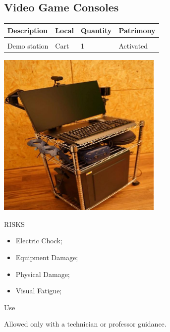 \subsection{Video Game Consoles}
\begin{tabularx}{\textwidth}{ Y  Y  Y  Y }
    \textbf{Description} &  \textbf{Local} &  \textbf{Quantity} & \textbf{Patrimony}\\
    \hline \\
     Demo station & Cart & 1 & Activated
\end{tabularx}
\vspace{1cm}

\begin{multicols}{2}

\includegraphics[width=80mm, keepaspectratio]{imgs/image3.jpg}

\columnbreak

\begin{mdframed}[roundcorner=10pt, linecolor=red, linewidth=2pt]
\vspace{1em}
{\Large {\color{red}RISKS}}
\vspace{1em}

\begin{itemize}
    \item Electric Chock;
    \item Equipment Damage;
    \item Physical Damage;
    \item Visual Fatigue; 
\end{itemize}

\vspace{1em}
\end{mdframed}

\vspace{2em}

{\Large Use}
\vspace{1em}

Allowed only with a technician or professor guidance.
\end{multicols}

